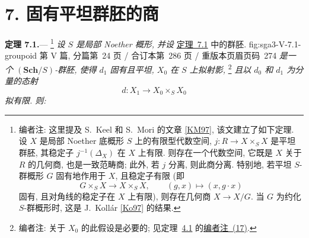 
\section*{7. 固有平坦群胚的商}
\label{sec:sga3-V-7}

\medskip
{}\label{thm:sga3-V-7.1}%
\noindent\textbf{定理 7.1.}---%
\footnote{\label{note:sga3-V-34}编者注: 这里提及
S.~Keel 和 S.~Mori 的文章 \hyperref[bib:sga3-V-KM97]{[KM97]},
该文建立了如下定理. 设 \(X\) 是局部 Noether 底概形 \(S\)
上的有限型代数空间, \(j:R\to X\times_S X\) 是平坦群胚,
其稳定子 \(j^{-1}(\Delta_X)\) 在 \(X\) 上有限.
则存在一个代数空间, 它既是 \(X\) 关于 \(R\) 的几何商,
也是一致范畴商; 此外, 若 \(j\) 分离, 则此商分离.
特别地, 若平坦 \(S\)-群概形 \(G\) 固有地作用于 \(X\),
且稳定子有限 (即
\[
  G\times_S X\longrightarrow X\times_S X,\qquad
  (g,x)\longmapsto(x,g\cdot x)
\]
固有, 且对角线的稳定子在 \(X\) 上有限), 则存在几何商 \(X\to X/G\).
当 \(G\) 为约化 \(S\)-群概形时, 这是 J.~Koll\'ar
\hyperref[bib:sga3-V-Ko97]{[Ko97]} 的结果.}%
\emph{设 \(S\) 是局部 Noether 概形, 并设}
  {\hyperref[thm:sga3-V-7.1]{定理~7.1} 中的群胚.}
  {fig:sga3-V-7.1-groupoid}
  {第 V 篇, 分篇第~24 页 / 合订本第~286 页 / 重版本页眉页码~274}
\emph{是一个 \((\mathbf{Sch}/S)\)-群胚,
使得 \(d_1\) 固有且平坦, \(X_0\) 在 \(S\) 上拟射影,}%
\footnote{\label{note:sga3-V-35}编者注: 关于 \(X_0\) 的此假设是必要的;
见定理~\hyperref[thm:sga3-V-4.1]{4.1} 的\hyperref[note:sga3-V-17]{编者注~(17)}.}
\emph{且以 \(d_0\) 和 \(d_1\) 为分量的态射
\[
  d:X_1\longrightarrow X_0\times_S X_0
\]
拟有限. 则:}
